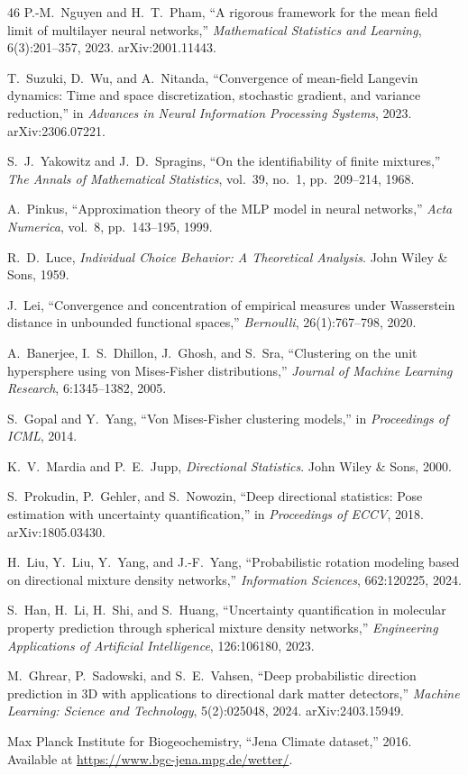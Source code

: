\documentclass[11pt]{article}
\begin{document}
\begin{thebibliography}{46}
P.-M.~Nguyen and H.~T.~Pham,
``A rigorous framework for the mean field limit of multilayer neural
networks,''
\emph{Mathematical Statistics and Learning}, 6(3):201--357, 2023.
arXiv:2001.11443.

T.~Suzuki, D.~Wu, and A.~Nitanda,
``Convergence of mean-field {L}angevin dynamics: Time and space
discretization, stochastic gradient, and variance reduction,''
in \emph{Advances in Neural Information Processing Systems}, 2023.
arXiv:2306.07221.

S.~J.~Yakowitz and J.~D.~Spragins,
``On the identifiability of finite mixtures,''
\emph{The Annals of Mathematical Statistics},
vol.~39, no.~1, pp.~209--214, 1968.

A.~Pinkus,
``Approximation theory of the {MLP} model in neural networks,''
\emph{Acta Numerica}, vol.~8, pp.~143--195, 1999.

R.~D.~Luce,
\emph{Individual Choice Behavior: A Theoretical Analysis}.
John Wiley \& Sons, 1959.

J.~Lei,
``Convergence and concentration of empirical measures under
{W}asserstein distance in unbounded functional spaces,''
\emph{Bernoulli}, 26(1):767--798, 2020.

A.~Banerjee, I.~S.~Dhillon, J.~Ghosh, and S.~Sra,
``Clustering on the unit hypersphere using von {M}ises-{F}isher
distributions,''
\emph{Journal of Machine Learning Research}, 6:1345--1382, 2005.

S.~Gopal and Y.~Yang,
``Von {M}ises-{F}isher clustering models,''
in \emph{Proceedings of ICML}, 2014.

K.~V.~Mardia and P.~E.~Jupp,
\emph{Directional Statistics}.
John Wiley \& Sons, 2000.

S.~Prokudin, P.~Gehler, and S.~Nowozin,
``Deep directional statistics: Pose estimation with uncertainty
quantification,''
in \emph{Proceedings of ECCV}, 2018.
arXiv:1805.03430.

H.~Liu, Y.~Liu, Y.~Yang, and J.-F.~Yang,
``Probabilistic rotation modeling based on directional mixture density
networks,''
\emph{Information Sciences}, 662:120225, 2024.

S.~Han, H.~Li, H.~Shi, and S.~Huang,
``Uncertainty quantification in molecular property prediction through
spherical mixture density networks,''
\emph{Engineering Applications of Artificial Intelligence},
126:106180, 2023.

M.~Ghrear, P.~Sadowski, and S.~E.~Vahsen,
``Deep probabilistic direction prediction in {3D} with applications to
directional dark matter detectors,''
\emph{Machine Learning: Science and Technology}, 5(2):025048, 2024.
arXiv:2403.15949.

Max Planck Institute for Biogeochemistry,
``Jena Climate dataset,'' 2016.
Available at \url{https://www.bgc-jena.mpg.de/wetter/}.

\end{thebibliography}
\end{document}
